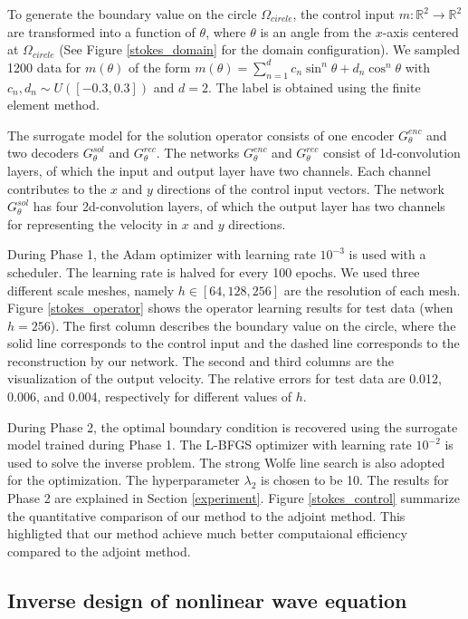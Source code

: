 \documentclass[letterpaper]{article}
\begin{document}
To generate the boundary value on the circle $\Omega_{circle}$, the control input $m: \mathbb{R}^2 \rightarrow \mathbb{R}^2$ are transformed into a function of $\theta$, where $\theta$ is an angle from the $x$-axis centered at $\Omega_{circle}$ (See Figure \ref{stokes_domain} for the domain configuration). We sampled 1200 data for $m(\theta)$ of the form $m(\theta) = \sum_{n=1}^{d} c_n \sin^n \theta + d_n \cos^n \theta$ with $c_n, d_n \sim U([-0.3, 0.3])$ and $d=2$. The label is obtained using the finite element method.

The surrogate model for the solution operator consists of one encoder $G_\theta^{enc}$ and two decoders $G_\theta^{sol}$ and $G_\theta^{rec}$. The networks $G_\theta^{enc}$ and $G_\theta^{rec}$ consist of 1d-convolution layers, of which the input and output layer have two channels. Each channel contributes to the $x$ and $y$ directions of the control input vectors. The network $G_\theta^{sol}$ has four 2d-convolution layers, of which the output layer has two channels for representing the velocity in $x$ and $y$ directions. 

During Phase 1, the Adam optimizer with learning rate $10^{-3}$ is used with a scheduler. The learning rate is halved for every 100 epochs. We used three different scale meshes, namely $h \in [64, 128, 256]$ are the resolution of each mesh. Figure \ref{stokes_operator} shows the operator learning results for test data (when $h=256$). The first column describes the boundary value on the circle, where the solid line corresponds to the control input and the dashed line corresponds to the reconstruction by our network. The second and third columns are the visualization of the output velocity. The relative errors for test data are 0.012, 0.006, and 0.004, respectively for different values of $h$.


During Phase 2, the optimal boundary condition is recovered using the surrogate model trained during Phase 1. The L-BFGS optimizer with learning rate $10^{-2}$ is used to solve the inverse problem. The strong Wolfe line search is also adopted for the optimization. The hyperparameter $\lambda_2$ is chosen to be 10. The results for Phase 2 are explained in Section \ref{experiment}. Figure \ref{stokes_control} summarize the quantitative comparison of our method to the adjoint method. This highligted that our method achieve much better computaional efficiency compared to the adjoint method.



\subsection{Inverse design of nonlinear wave equation}\label{appendix_wave}
\end{document}
